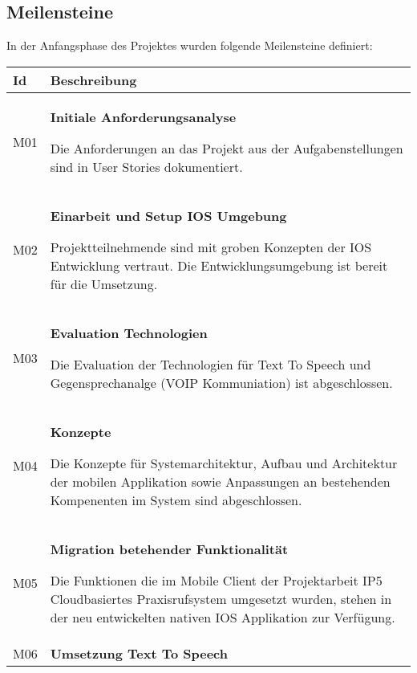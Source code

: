 \subsection{Meilensteine}

In der Anfangsphase des Projektes wurden folgende Meilensteine definiert:

\begin{table}[h]
    \centering
    \begin{tabular}{|l|p{15cm}|}
        \hline
        \textbf{Id} & \textbf{Beschreibung}                                                                                                                                                                                         \\
        \hline

        M01         & \textbf{Initiale Anforderungsanalyse}

        Die Anforderungen an das Projekt aus der Aufgabenstellungen sind in User Stories dokumentiert.\\
        \hline

        M02         & \textbf{Einarbeit und Setup IOS Umgebung}

        Projektteilnehmende sind mit groben Konzepten der IOS Entwicklung vertraut.
        Die Entwicklungsumgebung ist bereit für die Umsetzung. \\
        \hline

        M03         & \textbf{Evaluation Technologien}

        Die Evaluation der Technologien für Text To Speech und Gegensprechanalge (VOIP Kommuniation) ist abgeschlossen. \\
        \hline

        M04         & \textbf{Konzepte}

        Die Konzepte für Systemarchitektur, Aufbau und Architektur der mobilen Applikation sowie Anpassungen
        an bestehenden Kompenenten im System sind abgeschlossen. \\
        \hline

        M05         & \textbf{Migration betehender Funktionalität}

        Die Funktionen die im Mobile Client der Projektarbeit IP5 Cloudbasiertes Praxisrufsystem umgesetzt wurden,
        stehen in der neu entwickelten nativen IOS Applikation zur Verfügung. \\
        \hline

        M06         & \textbf{Umsetzung Text To Speech}


\end{tabular}
\end{table}
